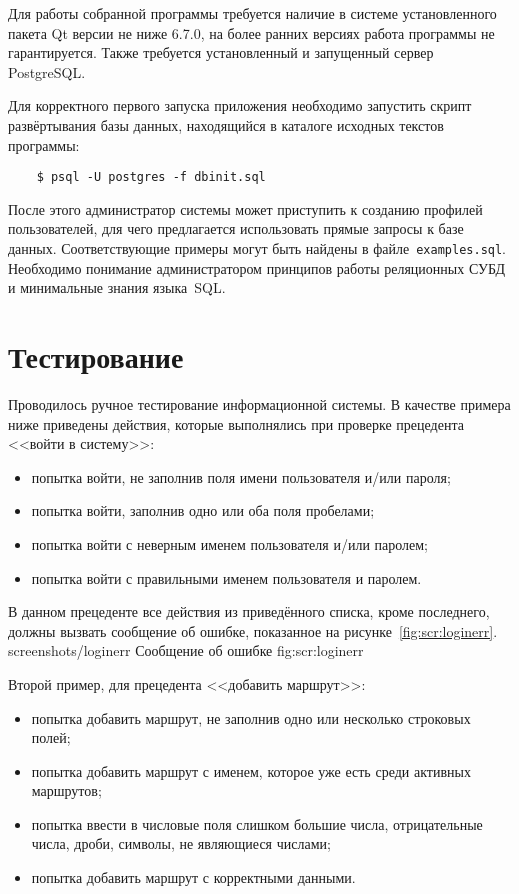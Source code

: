 Для работы собранной программы требуется наличие в системе
установленного пакета Qt версии не ниже 6.7.0, на более ранних
версиях работа программы не гарантируется. Также требуется
установленный и запущенный сервер PostgreSQL.

Для корректного первого запуска приложения необходимо запустить 
скрипт развёртывания базы данных, находящийся
в каталоге исходных текстов программы:

\begin{lstlisting}
    $ psql -U postgres -f dbinit.sql 
\end{lstlisting}

После этого администратор системы может приступить к 
созданию профилей пользователей, для чего предлагается 
использовать прямые запросы к базе данных. 
Соответствующие примеры могут быть найдены в файле~\texttt{examples.sql}. 
Необходимо понимание администратором принципов работы 
реляционных СУБД и минимальные знания языка~SQL.


\section{Тестирование}
Проводилось ручное тестирование информационной системы. В качестве 
примера ниже приведены действия, которые выполнялись при проверке 
прецедента <<войти в систему>>:
\begin{itemize}
    \item попытка войти, не заполнив поля имени пользователя и/или пароля;
    \item попытка войти, заполнив одно или оба поля пробелами;
    \item попытка войти с неверным именем пользователя и/или паролем;
    \item попытка войти с правильными именем пользователя и паролем.
\end{itemize}

В данном прецеденте все действия из приведённого списка, кроме последнего, должны
вызвать сообщение об ошибке, показанное на рисунке~\ref{fig:scr:loginerr}.
\image
    {screenshots/loginerr}
    {Сообщение об ошибке}
    {fig:scr:loginerr}

\newpage
Второй пример, для прецедента <<добавить маршрут>>:
\begin{itemize}
    \item попытка добавить маршрут, не заполнив одно или 
        несколько строковых полей;
    \item попытка добавить маршрут с именем, которое уже есть среди
        активных маршрутов;
    \item попытка ввести в числовые поля слишком большие числа,
        отрицательные числа, дроби, символы, не являющиеся числами;
    \item попытка добавить маршрут с корректными данными.
\end{itemize}


